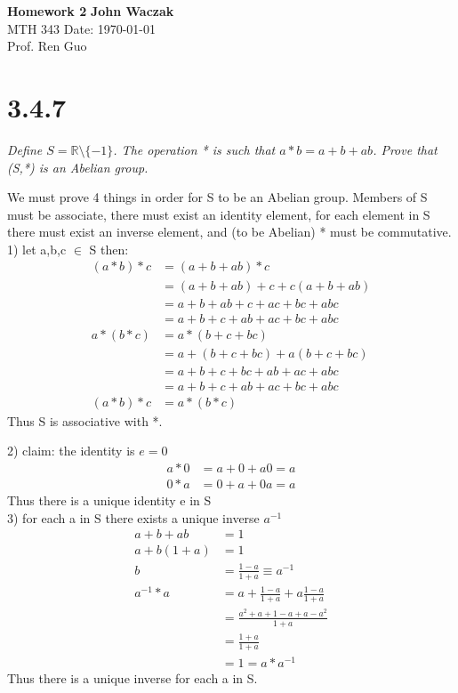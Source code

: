 \documentclass[a4paper, 11pt]{article}
\begin{document}
\noindent
\large\textbf{Homework 2} \hfill \textbf{John Waczak} \\
\normalsize MTH 343 \hfill  Date: \today \\
Prof. Ren Guo  \\

\section*{3.4.7}
\textit{Define $S = \mathbb{R}\setminus\{-1\}$. The operation * is such that $a*b = a + b +ab$. Prove that (S,*) is an Abelian group.}

We must prove 4 things in order for S to be an Abelian group. Members of S must be associate, there must exist an identity element, for each element in S there must exist an inverse element, and (to be Abelian) * must be commutative. \\

1) let a,b,c $\in$ S then:
\begin{align*}
	(a \ast b) \ast c &= (a+b+ab)\ast c \\
	&= (a+b+ab)+c+c(a+b+ab) \\ 
	&= a+b+ab+c+ac+bc+abc \\
	&= a+b+c+ab+ac+bc+abc \\
	a \ast (b \ast c) &= a \ast (b+c+bc) \\ 
	&=a+(b+c+bc)+a(b+c+bc) \\ 
	&=a+b+c+bc+ab+ac+abc \\ 
	&= a+b+c+ab+ac+bc+abc \\ 
	(a \ast b) \ast c &= a \ast (b \ast c)
\end{align*}
Thus S is associative with *. 

2) claim: the identity is $e=0$ 
\begin{align*}
	a \ast 0 &= a + 0 + a0 = a \\ 
	0 \ast a &= 0 + a + 0a = a 
\end{align*}
Thus there is a unique identity e in S \\ 

3) for each a in S there exists a unique inverse $a^{-1}$
\begin{align*}
	a+b+ab &= 1 \\ 
	a+b(1+a)&= 1 \\ 
	b &= \frac{1-a}{1+a} \equiv a^{-1} \\
	a^{-1} \ast a &= a + \frac{1-a}{1+a} + a\frac{1-a}{1+a} \\ 
	&= \frac{a^2+a+1-a+a-a^2}{1+a} \\ 
	&= \frac{1+a}{1+a} \\ 
	&= 1 = a \ast a^{-1}
\end{align*}
Thus there is a unique inverse for each a in S. 
\end{document}

